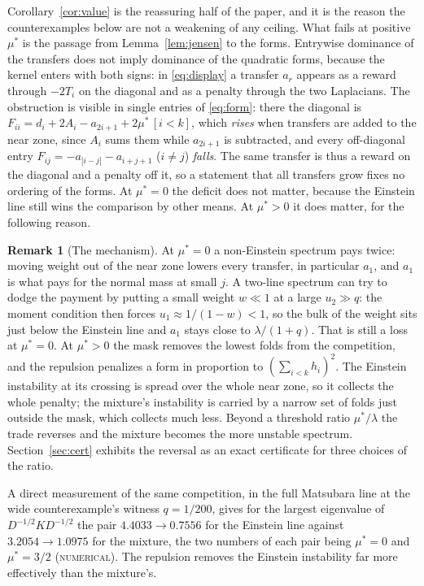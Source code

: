 \documentclass[11pt]{article}
\newcommand{\muS}{\mu^{*}}
\theoremstyle{definition}
\newtheorem{remark}[theorem]{Remark}
\theoremstyle{remark}
\begin{document}
Corollary~\ref{cor:value} is the reassuring half of the paper, and it is the reason the
counterexamples below are not a weakening of any ceiling. What fails at positive $\muS$ is
the passage from Lemma~\ref{lem:jensen} to the forms. Entrywise dominance of the transfers
does not imply dominance of the quadratic forms, because the kernel enters with both
signs: in \eqref{eq:display} a transfer $a_r$ appears as a reward through $-2T_i$ on the
diagonal and as a penalty through the two Laplacians. The obstruction is visible in single
entries of \eqref{eq:form}: there the diagonal is
$F_{ii}=d_i+2A_i-a_{2i+1}+2\muS\,[i<k]$, which \emph{rises} when transfers are added to
the near zone, since $A_i$ sums them while $a_{2i+1}$ is subtracted, and every off-diagonal
entry $F_{ij}=-a_{|i-j|}-a_{i+j+1}$ ($i\ne j$) \emph{falls}. The same transfer is thus a
reward on the diagonal and a penalty off it, so a statement that all transfers grow fixes
no ordering of the forms. At $\muS=0$ the deficit does
not matter, because the Einstein line still wins the comparison by other means. At
$\muS>0$ it does matter, for the following reason.

\begin{remark}[The mechanism]\label{rem:mech}
At $\muS=0$ a non-Einstein spectrum pays twice: moving weight out of the near zone lowers
every transfer, in particular $a_1$, and $a_1$ is what pays for the normal mass at small
$j$. A two-line spectrum can try to dodge the payment by putting a small weight $w\ll1$ at
a large $u_2\gg q$: the moment condition then forces $u_1\approx1/(1-w)<1$, so the bulk of
the weight sits just below the Einstein line and $a_1$ stays close to
$\lambda/(1+q)$. That is still a loss at $\muS=0$. At $\muS>0$ the mask removes the lowest
folds from the competition, and the repulsion penalizes a form in proportion to
$(\sum_{i<k}h_i)^2$. The Einstein instability at its crossing is spread over the whole
near zone, so it collects the whole penalty; the mixture's instability is carried by a
narrow set of folds just outside the mask, which collects much less. Beyond a threshold
ratio $\muS/\lambda$ the trade reverses and the mixture becomes the more unstable
spectrum. Section~\ref{sec:cert} exhibits the reversal as an exact certificate for three
choices of the ratio.
\end{remark}

A direct measurement of the same competition, in the full Matsubara line at the wide
counterexample's witness $q=1/200$, gives for the largest eigenvalue of
$D^{-1/2}KD^{-1/2}$ the pair $4.4033\to0.7556$ for the Einstein line against
$3.2054\to1.0975$ for the mixture, the two numbers of each pair being $\muS=0$ and
$\muS=3/2$ (\textsc{numerical}). The repulsion removes the Einstein instability far more
effectively than the mixture's.
\end{document}
